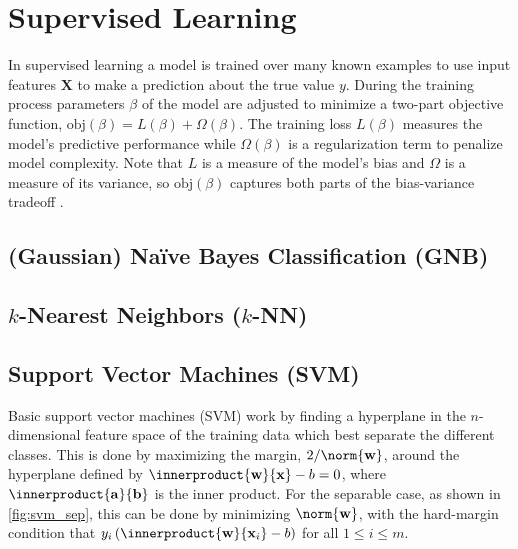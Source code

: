 \chapter{Supervised Learning}
\label{ml:supervised}

In supervised learning a model is trained over many known examples
to use input features $\mathbf{X}$ to make a prediction \yhat about the true value $y$.
During the training process parameters $\beta$ of
the model are adjusted to minimize a two-part objective function,
$\text{obj}\left(\beta\right) = L\left(\beta\right) + \Omega\left(\beta\right)$.
The training loss $L\left(\beta\right)$ measures the model's predictive performance
while $\Omega\left(\beta\right)$ is a regularization term to penalize model complexity.
Note that $L$ is a measure of the model's bias and $\Omega$ is a measure of its variance,
so $\text{obj}\left(\beta\right)$ captures both parts of the bias-variance tradeoff \cite{HastieTF09}.

\section{(Gaussian) N{a\"i}ve Bayes Classification (GNB)}
\label{ml:supervised:Bayes}

\section{\texorpdfstring{$k$}{k}-Nearest Neighbors (\texorpdfstring{$k$}{k}-NN)}
\label{ml:supervised:kNN}

\section{Support Vector Machines (SVM)}
\label{ml:supervised:SVM}

Basic support vector machines (SVM) work by finding a hyperplane in the $n$-dimensional
feature space of the training data which best separate the different classes.
This is done by maximizing the margin, $2/\norm{\mathbf{w}}$,
around the hyperplane defined by $\innerproduct{\mathbf{w}}{\mathbf{x}} - b = 0$,
where $\innerproduct{\mathbf{a}}{\mathbf{b}}$ is the inner product.
For the separable case, as shown in \cref{fig:svm_sep}, this
can be done by minimizing $\norm{\mathbf{w}}$, with the hard-margin condition that
$y_{i} \left(\innerproduct{\mathbf{w}}{\mathbf{x}_{i}} - b\right)$ for all $1 \leq i \leq m$.

